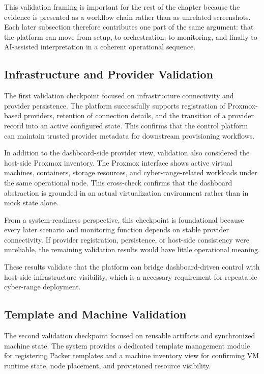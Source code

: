 This validation framing is important for the rest of the chapter because the evidence is presented as a workflow chain rather than as unrelated screenshots. Each later subsection therefore contributes one part of the same argument: that the platform can move from setup, to orchestration, to monitoring, and finally to AI-assisted interpretation in a coherent operational sequence.

\subsection{Infrastructure and Provider Validation}
The first validation checkpoint focused on infrastructure connectivity and provider persistence. The platform successfully supports registration of Proxmox-based providers, retention of connection details, and the transition of a provider record into an active configured state. This confirms that the control platform can maintain trusted provider metadata for downstream provisioning workflows.

In addition to the dashboard-side provider view, validation also considered the host-side Proxmox inventory. The Proxmox interface shows active virtual machines, containers, storage resources, and cyber-range-related workloads under the same operational node. This cross-check confirms that the dashboard abstraction is grounded in an actual virtualization environment rather than in mock state alone.

From a system-readiness perspective, this checkpoint is foundational because every later scenario and monitoring function depends on stable provider connectivity. If provider registration, persistence, or host-side consistency were unreliable, the remaining validation results would have little operational meaning.



These results validate that the platform can bridge dashboard-driven control with host-side infrastructure visibility, which is a necessary requirement for repeatable cyber-range deployment.

\subsection{Template and Machine Validation}
The second validation checkpoint focused on reusable artifacts and synchronized machine state. The system provides a dedicated template management module for registering Packer templates and a machine inventory view for confirming VM runtime state, node placement, and provisioned resource visibility.

